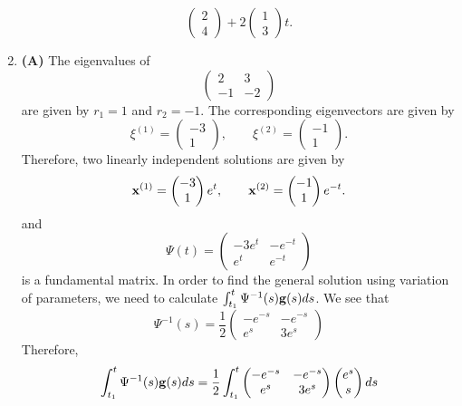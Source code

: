 \documentclass[11pt,a4paper]{article}
\begin{document}
\begin{enumerate}
$$\begin{pmatrix}
			2\\
			4
		\end{pmatrix} + 2
		\begin{pmatrix}
			1\\
			3
		\end{pmatrix}t.
		$$
		\item \textbf{(A)} The eigenvalues of
		$$
		\begin{pmatrix}
			2 & 3\\
			-1 & -2
		\end{pmatrix}
		$$
		are given by $r_1 = 1$ and $r_2 = -1$. The corresponding eigenvectors are given by
		$$
		\xi^{(1)} = 
		\begin{pmatrix}
			-3\\
			1
		\end{pmatrix},\qquad \xi^{(2)} =
		\begin{pmatrix}
			-1\\
			1
		\end{pmatrix}.
		$$
		Therefore, two linearly independent solutions are given by
		$$
		\vb{x}^{(1)} = 
		\begin{pmatrix}
			-3\\
			1
		\end{pmatrix}e^t,\qquad \vb{x}^{(2)} =
		\begin{pmatrix}
			-1\\
			1
		\end{pmatrix}e^{-t}.
		$$
		and
		$$
		\Psi(t) =
		\begin{pmatrix}
			-3e^t & -e^{-t}\\
			e^t & e^{-t}
		\end{pmatrix}
		$$
		is a fundamental matrix. In order to find the general solution using variation of parameters, we need to calculate $\int_{t_1}^t \Psi^{-1}(s)\vb{g}(s)ds$. We see that
		$$
		\Psi^{-1}(s) = \frac{1}{2}
		\begin{pmatrix}
			-e^{-s} & -e^{-s}\\
			e^s & 3e^s
		\end{pmatrix}
		$$
		Therefore,
		\begin{align*}
			\int_{t_1}^t \Psi^{-1}(s)\vb{g}(s)ds
			&= \frac{1}{2}\int_{t_1}^t
			\begin{pmatrix}
				-e^{-s} & -e^{-s}\\
				e^s & 3e^s
			\end{pmatrix}
			\begin{pmatrix}
				e^s\\
				s
			\end{pmatrix}ds\\

\end{align*}
\end{enumerate}
\end{document}
